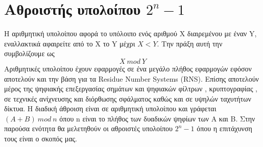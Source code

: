 \section{Αθροιστής υπολοίπου $2^n-1$}
Η αριθμητική υπολοίπου αφορά το υπόλοιπο ενός αριθμού X διαιρεμένου με έναν Y, εναλλακτικά
αφαιρείτε από το Χ το Y μέχρι $X < Y$. Την πράξη αυτή την συμβολίζουμε ως 
\begin{equation*}
    X\ mod\ Y
\end{equation*}
Αριθμητικές υπολοίπου έχουν εφαρμογές σε ένα μεγάλο πλήθος εφαρμογών εφόσον αποτελούν και 
την βάση για τα Residue Number Systems (RNS). Επίσης αποτελούν μέρος της ψηφιακής
επεξεργασίας σημάτων και ψηφιακών φίλτρων , κρυπτογραφίας , σε τεχνικές ανίχνευσης και διόρθωσης σφάλματος καθώς και σε υψηλών ταχυτήτων δίκτυα. Η διαδική άθροιση είναι σε 
αριθμητική υπολοίπου και γράφεται $(A+B)\ mod\ n$ όπου n είναι το πλήθος των δυαδικών 
ψηφίων των A και B. 
Στην παρούσα ενότητα θα μελετηθούν οι αθροιστές υπολοίπου $2^n-1$ όπου η επιτάχυνση τους είναι ο σκοπός μας.






